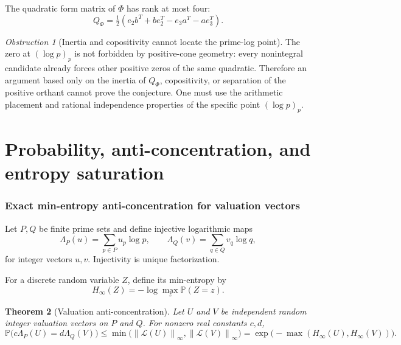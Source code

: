 \documentclass[11pt,oneside]{article}
\newtheorem{theorem}{Theorem}[section]
\theoremstyle{definition}
\theoremstyle{remark}
\newtheorem{obstruction}[theorem]{Obstruction}
\newcommand{\Prob}{\mathbb{P}}
\newcommand{\Hinf}{H_{\infty}}
\newcommand{\norm}[1]{\left\lVert #1\right\rVert}
\begin{document}
The quadratic form matrix of $\Phi$ has rank at most four:
\begin{equation}
 Q_\Phi=\tfrac12(e_2b^T+be_2^T-e_3a^T-ae_3^T).
 \label{eq:Phi-matrix}
\end{equation}

\begin{obstruction}[Inertia and copositivity cannot locate the prime-log point]
The zero at $(\log p)_p$ is not forbidden by positive-cone geometry: every nonintegral candidate already forces other positive zeros of the same quadratic.  Therefore an argument based only on the inertia of $Q_\Phi$, copositivity, or separation of the positive orthant cannot prove the conjecture.  One must use the arithmetic placement and rational independence properties of the specific point $(\log p)_p$.
\end{obstruction}

\part{Probability, anti-concentration, and entropy saturation}

\section{Exact min-entropy anti-concentration for valuation vectors}
\label{sec:minentropy}

Let $P,Q$ be finite prime sets and define injective logarithmic maps
\begin{equation}
 \Lambda_P(u)=\sum_{p\in P}u_p\log p,
 \qquad
 \Lambda_Q(v)=\sum_{q\in Q}v_q\log q,
 \label{eq:log-maps}
\end{equation}
for integer vectors $u,v$.  Injectivity is unique factorization.

For a discrete random variable $Z$, define its min-entropy by
\begin{equation}
 \Hinf(Z)=-\log\max_z\Prob(Z=z).
 \label{eq:minentropy}
\end{equation}

\begin{theorem}[Valuation anti-concentration]
\label{thm:minentropy}
Let $U$ and $V$ be independent random integer valuation vectors on $P$ and $Q$.  For nonzero real constants $c,d$,
\begin{equation}
 \Prob\bigl(c\Lambda_P(U)=d\Lambda_Q(V)\bigr)
 \le\min\bigl(\norm{\mathcal L(U)}_\infty,
               \norm{\mathcal L(V)}_\infty\bigr)
 =\exp\bigl(-\max(\Hinf(U),\Hinf(V))\bigr).
 \label{eq:minentropy-bound}
\end{equation}
\end{theorem}
\end{document}
